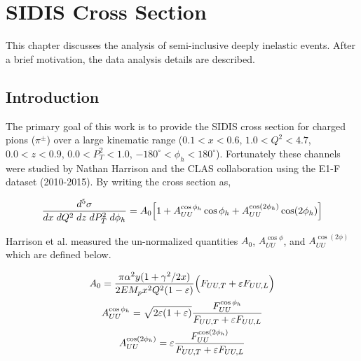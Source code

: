 %
%

\chapter{SIDIS Cross Section}
This chapter discusses the analysis of semi-inclusive deeply inelastic events.  After a brief motivation, the data analysis details are described.  

\section{Introduction}
The primary goal of this work is to provide the SIDIS cross section for charged pions ($\pi^{\pm}$) over a large kinematic range ($0.1 < x < 0.6$, $1.0 < Q^2 < 4.7$, $0.0 < z < 0.9$, $0.0 < P_{T}^{2} < 1.0$, $-180^\circ < \phi_h < 180^\circ$).  Fortunately these channels were studied by Nathan Harrison and the CLAS collaboration \cite{thesis-harrison:2015} using the E1-F dataset (2010-2015).  By writing the cross section as, 

\begin{equation}
	\frac{d^5\sigma}{dx \; dQ^2 \; dz \; dP_T^2 \; d\phi_h} = A_{0} \Bigl[ 1 + A_{UU}^{\cos\phi_h} \cos\phi_h + A_{UU}^{\cos(2\phi_h)} \cos(2\phi_h) \Bigr]
\end{equation}

Harrison et al. measured the un-normalized quantities $A_0$, $A_{UU}^{\cos\phi}$, and $A_{UU}^{\cos(2\phi)}$ which are defined below.  

\begin{gather}
	A_{0} = \frac{\pi \alpha^2 y (1+\gamma^2/2x)}{2 E M_p x^2 Q^2 (1-\varepsilon)} \Bigl( F_{UU,T} + \varepsilon F_{UU,L} \Bigr) \\
	A_{UU}^{\cos\phi_h} = \sqrt{2\varepsilon(1+\varepsilon)} \frac{F_{UU}^{\cos\phi_h}}{F_{UU,T} + \varepsilon F_{UU,L}} \\
	A_{UU}^{\cos(2\phi_h)} = \varepsilon \frac{F_{UU}^{\cos(2\phi_h)}}{F_{UU,T} + \varepsilon F_{UU,L}}
\end{gather}

